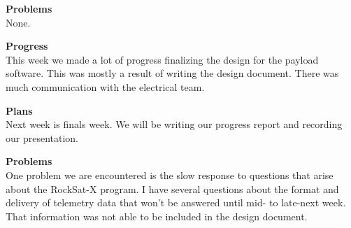 \textbf{Problems} \\ 
None.

\textbf{Progress} \\
This week we made a lot of progress finalizing the design for the \gls{payload} software. This was mostly a result of writing the design document. There was much communication with the electrical team.

\textbf{Plans} \\
Next week is finals week. We will be writing our progress report and recording our presentation.

\textbf{Problems} \\
One problem we are encountered is the slow response to questions that arise about the RockSat-X program. I have several questions about the format and delivery of telemetry data that won't be answered until mid- to late-next week. That information was not able to be included in the design document.
